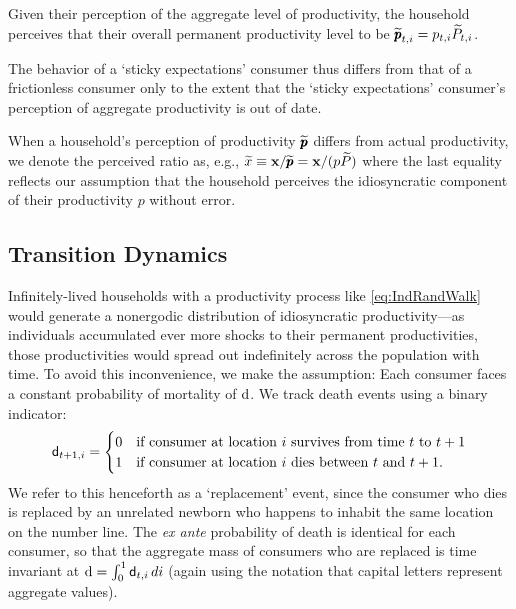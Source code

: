 Given their perception of the aggregate level of productivity, the household perceives that their overall permanent productivity level to be $\widetilde{\pmb{p}}_{t,i} = p_{t,i} \widetilde{P}_{t,i}$.

The behavior of a `sticky expectations' consumer thus differs from that of a frictionless consumer only to the extent that the `sticky expectations' consumer's perception of aggregate productivity is out of date.

When a household's perception of productivity $\widetilde{\pmb{p}}$ differs from actual productivity, we denote the perceived ratio as, e.g., $\widetilde{x} \equiv \mathbf{x}/\widetilde{\pmb{p}} = \mathbf{x}/({p}\widetilde{P})$ where the last equality reflects our assumption that the household perceives the idiosyncratic component of their productivity ${p}$ without error.


\subsection{Transition Dynamics}

Infinitely-lived households with a productivity process like \eqref{eq:IndRandWalk} would generate a nonergodic distribution of idiosyncratic productivity---as individuals accumulated ever more shocks to their permanent productivities, those productivities would spread out indefinitely across the population with time. To avoid this inconvenience, we make the \cite{blanchardFinite} assumption: Each consumer faces a constant probability of mortality of $\mathrm{d}$. %
We track death events using a binary indicator:
\begin{equation*}
\mathsf{d}_{t+1,i} =
  \begin{cases}
    0 & \text{if consumer at location $i$ survives from time $t$ to $t+1$}
\\    1 & \text{if consumer at location $i$ dies between $t$ and $t+1$}.
  \end{cases}
\end{equation*}
We refer to this henceforth as a `replacement' event, since the consumer who dies is replaced by an unrelated newborn who happens to inhabit the same location on the number line.  The {\it ex ante} probability of death is identical for each consumer, so that the aggregate mass of consumers who are replaced is time invariant at $\mathrm{d} = \int_{0}^{1} \mathsf{d}_{t,i}\,di$ (again using the notation that capital letters represent aggregate values).

